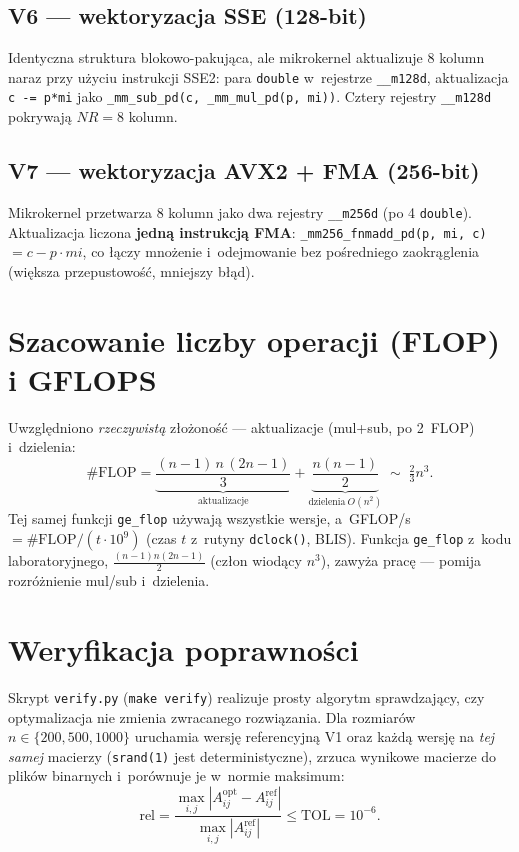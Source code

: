 \documentclass[11pt,a4paper]{article}
\begin{document}
\subsection{V6 --- wektoryzacja SSE (128-bit)}
Identyczna struktura blokowo-pakująca, ale mikrokernel aktualizuje 8 kolumn naraz przy
użyciu instrukcji SSE2: para \texttt{double} w~rejestrze \texttt{\_\_m128d}, aktualizacja
\texttt{c -= p*mi} jako \texttt{\_mm\_sub\_pd(c, \_mm\_mul\_pd(p, mi))}. Cztery rejestry
\texttt{\_\_m128d} pokrywają $NR=8$ kolumn.

\subsection{V7 --- wektoryzacja AVX2 + FMA (256-bit)}
Mikrokernel przetwarza 8 kolumn jako dwa rejestry \texttt{\_\_m256d} (po 4 \texttt{double}).
Aktualizacja liczona \textbf{jedną instrukcją FMA}:
\texttt{\_mm256\_fnmadd\_pd(p, mi, c)} $= c - p\cdot mi$, co łączy mnożenie i~odejmowanie
bez pośredniego zaokrąglenia (większa przepustowość, mniejszy błąd).

\section{Szacowanie liczby operacji (FLOP) i GFLOPS}

Uwzględniono \emph{rzeczywistą} złożoność --- aktualizacje (mul+sub, po 2~FLOP) i~dzielenia:
\[
\#\text{FLOP}
= \underbrace{\frac{(n-1)\,n\,(2n-1)}{3}}_{\text{aktualizacje}}
+ \underbrace{\frac{n(n-1)}{2}}_{\text{dzielenia}~O(n^2)}
\;\sim\; \tfrac{2}{3}n^3 .
\]
Tej samej funkcji \texttt{ge\_flop} używają wszystkie wersje, a~GFLOP/s${}=\#\text{FLOP}/(t\cdot10^9)$
(czas $t$ z~rutyny \texttt{dclock()}, BLIS). Funkcja \texttt{ge\_flop} z~kodu laboratoryjnego,
$\tfrac{(n-1)n(2n-1)}{2}$ (człon wiodący $n^3$), zawyża pracę --- pomija rozróżnienie mul/sub
i~dzielenia.

\section{Weryfikacja poprawności}

Skrypt \texttt{verify.py} (\texttt{make verify}) realizuje prosty algorytm sprawdzający, czy
optymalizacja nie zmienia zwracanego rozwiązania. Dla rozmiarów $n\in\{200,500,1000\}$
uruchamia wersję referencyjną V1 oraz każdą wersję na \emph{tej samej} macierzy
(\texttt{srand(1)} jest deterministyczne), zrzuca wynikowe macierze do plików binarnych
i~porównuje je w~normie maksimum:
\[
\text{rel} = \frac{\max_{i,j}|A^{\text{opt}}_{ij}-A^{\text{ref}}_{ij}|}{\max_{i,j}|A^{\text{ref}}_{ij}|}
\le \text{TOL} = 10^{-6}.
\]
\end{document}
